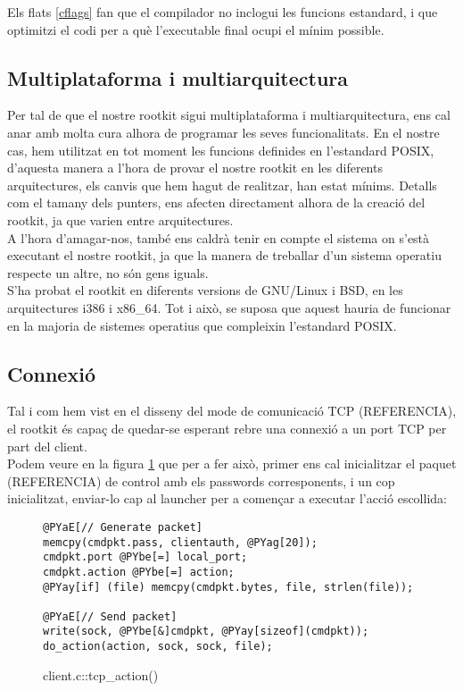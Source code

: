 Els flats \ref{cflags} fan que el compilador no inclogui les funcions estandard, i que optimitzi el codi 
per a què l'executable final ocupi el mínim possible.

\subsection{Multiplataforma i multiarquitectura}

Per tal de que el nostre rootkit sigui multiplataforma i multiarquitectura, ens cal anar amb molta cura alhora de programar les 
seves funcionalitats. En el nostre cas, hem utilitzat en tot moment les funcions definides en l'estandard POSIX, d'aquesta manera a l'hora de provar el nostre rootkit en les diferents arquitectures, els canvis que hem hagut de realitzar, han estat mínims. Detalls com el tamany dels punters, ens afecten directament alhora de la creació
del rootkit, ja que varien entre arquitectures. \\

A l'hora d'amagar-nos, també ens caldrà tenir en compte el sistema on s'està executant el nostre rootkit, ja que la manera de treballar
d'un sistema operatiu respecte un altre, no són gens iguals. \\

S'ha probat el rootkit en diferents versions de GNU/Linux i BSD, en les arquitectures i386 i x86\_64. Tot
i això, se suposa que aquest hauria de funcionar en la majoria de sistemes operatius que compleixin 
l'estandard POSIX.


\subsection{Connexió}

Tal i com hem vist en el disseny del mode de comunicació TCP (REFERENCIA), el rootkit és capaç de quedar-se 
esperant rebre una connexió a un port TCP per part del client. \\

Podem veure en la figura \ref{fig:client_tcp_action2} que per a fer això, primer ens cal inicialitzar el paquet (REFERENCIA) de control amb els passwords corresponents, i un cop inicialitzat, enviar-lo cap al launcher per a començar a executar l'acció escollida: 

\begin{figure}[htp]
\begin{Verbatim}[commandchars=@\[\]]
@PYaE[// Generate packet]
memcpy(cmdpkt.pass, clientauth, @PYag[20]);
cmdpkt.port @PYbe[=] local_port;
cmdpkt.action @PYbe[=] action;
@PYay[if] (file) memcpy(cmdpkt.bytes, file, strlen(file));

@PYaE[// Send packet]
write(sock, @PYbe[&]cmdpkt, @PYay[sizeof](cmdpkt));
do_action(action, sock, sock, file);
\end{Verbatim}
\caption{client.c::tcp\_action()}
\label{fig:client_tcp_action2}
\end{figure}

